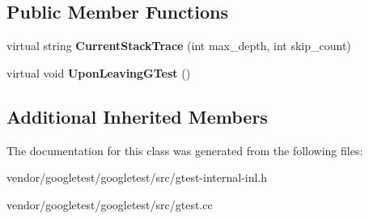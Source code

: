 \subsection*{Public Member Functions}
\begin{DoxyCompactItemize}
\item 
\mbox{\label{classtesting_1_1internal_1_1_os_stack_trace_getter_ad85d7766a222befa3e7f3c6932046ac2}} 
virtual string {\bfseries Current\+Stack\+Trace} (int max\+\_\+depth, int skip\+\_\+count)
\item 
\mbox{\label{classtesting_1_1internal_1_1_os_stack_trace_getter_a8ae0237629b6b5672b4b5ef8e292205c}} 
virtual void {\bfseries Upon\+Leaving\+G\+Test} ()
\end{DoxyCompactItemize}
\subsection*{Additional Inherited Members}


The documentation for this class was generated from the following files\+:\begin{DoxyCompactItemize}
\item 
vendor/googletest/googletest/src/gtest-\/internal-\/inl.\+h\item 
vendor/googletest/googletest/src/gtest.\+cc\end{DoxyCompactItemize}
